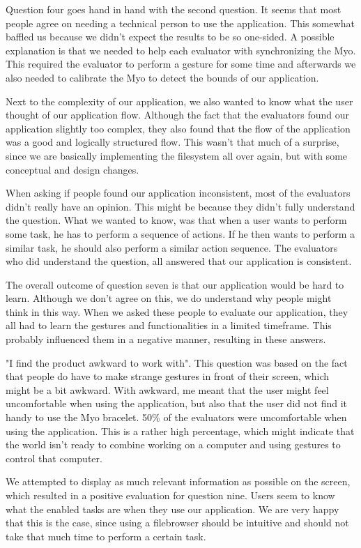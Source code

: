 \documentclass{article}
\begin{document}
Question four goes hand in hand with the second question. It seems that most people agree on needing a technical person to use the application. This somewhat baffled us because we didn't expect the results to be so one-sided. A possible explanation is that we needed to help each evaluator with synchronizing the Myo. This required the evaluator to perform a gesture for some time and afterwards we also needed to calibrate the Myo to detect the bounds of our application.

Next to the complexity of our application, we also wanted to know what the user thought of our application flow. Although the fact that the evaluators found our application slightly too complex, they also found that the flow of the application was a good and logically structured flow. This wasn't that much of a surprise, since we are basically implementing the filesystem all over again, but with some conceptual and design changes.

When asking if people found our application inconsistent, most of the evaluators didn't really have an opinion. This might be because they didn't fully understand the question. What we wanted to know, was that when a user wants to perform some task, he has to perform a sequence of actions. If he then wants to perform a similar task, he should also perform a similar action sequence. The evaluators who did understand the question, all answered that our application is consistent.

The overall outcome of question seven is that our application would be hard to learn. Although we don't agree on this, we do understand why people might think in this way. When we asked these people to evaluate our application, they all had to learn the gestures and functionalities in a limited timeframe. This probably influenced them in a negative manner, resulting in these answers.

"I find the product awkward to work with". This question was based on the fact that people do have to make strange gestures in front of their screen, which might be a bit awkward. With awkward, me meant that the user might feel uncomfortable when using the application, but also that the user did not find it handy to use the Myo bracelet. 50\% of the evaluators were uncomfortable when using the application. This is a rather high percentage, which might indicate that the world isn't ready to combine working on a computer and using gestures to control that computer.

We attempted to display as much relevant information as possible on the screen, which resulted in a positive evaluation for question nine. Users seem to know what the enabled tasks are when they use our application. We are very happy that this is the case, since using a filebrowser should be intuitive and should not take that much time to perform a certain task.
\end{document}
